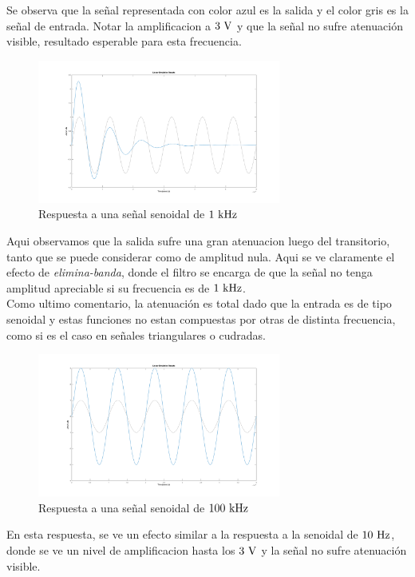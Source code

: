 Se observa que la señal representada con color azul es la salida  y el color gris es la señal de entrada. Notar la amplificacion a $3\ \si{\volt}$ y que la señal no sufre atenuaci\'on visible, resultado esperable para esta frecuencia.\\

\begin{figure}[!h]
	\centering
	\includegraphics[width=8cm]{imagenes/rtasen1k}	\caption{Respuesta a una señal senoidal de $1\ \si{\kilo\hertz}$}	
\end{figure}

Aqui observamos que la salida sufre una gran atenuacion luego del transitorio, tanto que se puede considerar como de amplitud nula. Aqui se ve claramente el efecto de \textit{elimina-banda}, donde el filtro se encarga de que la señal no tenga amplitud apreciable si su frecuencia es de $1\ \si{\kilo\hertz}$.\\
Como ultimo comentario, la atenuaci\'on es total dado que la entrada es de tipo senoidal y estas funciones no estan compuestas por otras de distinta frecuencia,  como si es el  caso en señales triangulares o cudradas.\\

\begin{figure}[!h]
	\centering
	\includegraphics[width=8cm]{imagenes/rtasen100k}	\caption{Respuesta a una señal senoidal de $100\ \si{\kilo\hertz}$}	
\end{figure}
En esta respuesta, se ve un efecto similar a la respuesta a la senoidal de $10\ \si{\hertz}$, donde se ve un nivel de  amplificacion hasta los $3\ \si{\volt}$ y la  señal no sufre atenuaci\'on visible.\\

